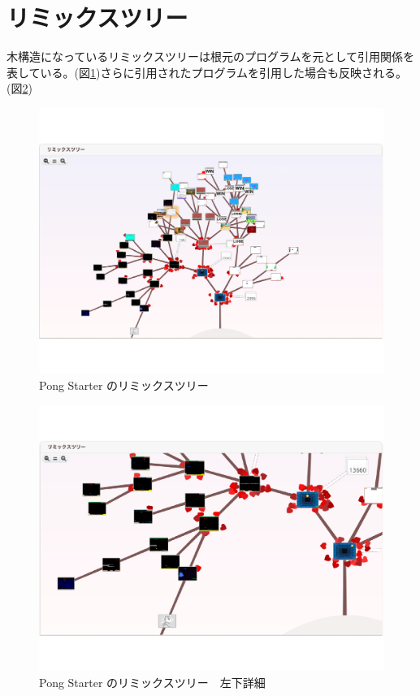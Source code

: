 \documentclass[a4paper,10pt,onecolumn,oneside,openany]{jsbook}
\begin{document}
\section{リミックスツリー}
木構造になっているリミックスツリーは根元のプログラムを元として引用関係を表している。(図\ref{psrt})さらに引用されたプログラムを引用した場合も反映される。(図\ref{rtdit})

\begin{figure}[ht]
  \centering
    \includegraphics[scale=0.5]{graphic/remixtree_all.pdf}
  \caption{Pong Starter のリミックスツリー}
  \label{psrt}
 \end{figure}

\begin{figure}[hb]
  \centering
    \includegraphics[scale=0.5]{graphic/remixtree_detail.pdf}
  \caption{Pong Starter のリミックスツリー　左下詳細}
  \label{rtdit}
 \end{figure}
\end{document}
